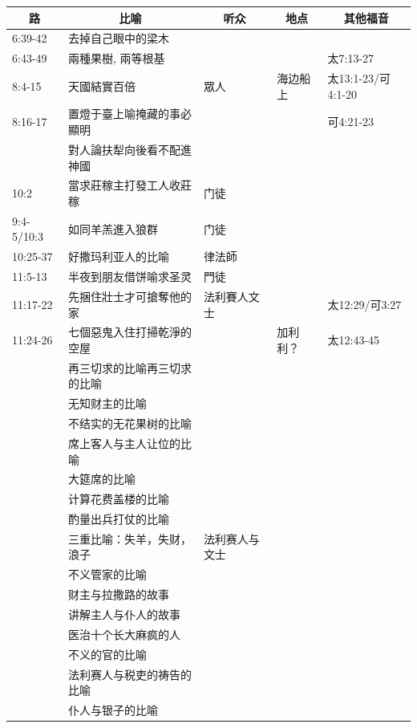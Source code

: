 \begin{table}[H]
\centering
\begin{tabular}{p{}|p{5.5cm}|p{2.5cm}|p{}|p{3.8cm}}\hline\hline
\multicolumn{1}{c|}{路}&\multicolumn{1}{c|}{比喻}&\multicolumn{1}{c|}{听众}&\multicolumn{1}{c|}{地点}&\multicolumn{1}{c}{其他福音}\\\hline
6:39-42&去掉自己眼中的梁木&  & &\\\hline
 6:43-49&兩種果樹, 兩等根基&    & &太7:13-27\\\hline
8:4-15 &天國結實百倍& 眾人   & 海边船上&太13:1-23/可4:1-20\\\hline
8:16-17 & 置燈于臺上喻掩藏的事必顯明 & & &可4:21-23\\\hline
& 對人論扶犁向後看不配進神國& & &\\\hline
10:2& 當求莊稼主打發工人收莊稼&门徒 & &\\\hline
9:4-5/10:3&如同羊羔進入狼群&门徒 & &\\\hline
 10:25-37&好撒玛利亚人的比喻 &律法師 & &\\\hline
11:5-13 & 半夜到朋友借饼喻求圣灵& 門徒 &&\\\hline
11:17-22&先捆住壯士才可搶奪他的家& 法利賽人文士 &&太12:29/可3:27\\\hline
11:24-26&七個惡鬼入住打掃乾淨的空屋&&加利利？&太12:43-45\\\hline

&再三切求的比喻再三切求的比喻& & &\\\hline
&无知财主的比喻& & &\\\hline

&不结实的无花果树的比喻& && \\\hline

&席上客人与主人让位的比喻& && \\\hline

&大筵席的比喻& && \\\hline

&计算花费盖楼的比喻& & &\\\hline

 &酌量出兵打仗的比喻& && \\\hline

&三重比喻：失羊，失财，浪子& 法利赛人与文士& &\\\hline

&不义管家的比喻& && \\\hline

&财主与拉撒路的故事& & &\\\hline

&讲解主人与仆人的故事& && \\\hline

&医治十个长大麻疯的人& && \\\hline

&不义的官的比喻& && \\\hline

&法利赛人与税吏的祷告的比喻& && \\\hline

&仆人与银子的比喻& && \\\hline
\end{tabular}
\end{table}





